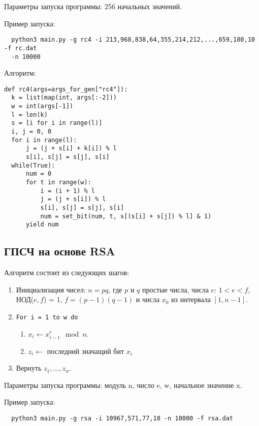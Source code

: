 \documentclass[spec, och, labwork]{shiza}
\begin{document}
Параметры запуска программы: 256 начальных значений.

Пример запуска:
\begin{small}
\begin{verbatim}
  python3 main.py -g rc4 -i 213,968,838,64,355,214,212,...,659,180,10 -f rc.dat 
  -n 10000
 \end{verbatim}
\end{small}

Алгоритм:
\begin{small}
\begin{verbatim}
def rc4(args=args_for_gen["rc4"]):
  k = list(map(int, args[:-2]))
  w = int(args[-1])
  l = len(k)
  s = [i for i in range(l)]
  i, j = 0, 0
  for i in range(l):
      j = (j + s[i] + k[i]) % l
      s[i], s[j] = s[j], s[i]
  while(True):
      num = 0
      for t in range(w):
          i = (i + 1) % l
          j = (j + s[i]) % l
          s[i], s[j] = s[j], s[i]
          num = set_bit(num, t, s[(s[i] + s[j]) % l] & 1)
      yield num
\end{verbatim}
\end{small}


\subsection{ГПСЧ на основе RSA}

Алгоритм состоит из следующих шагов:
\begin{enumerate}
  \item Инициализация чисел: $n = pq$, где $p$ и $q$ простые числа, числа $e$: $1 < e < f$, НОД($e, f$) = 1, $f = (p - 1)(q - 1)$ и числа $x_0$ из интервала $[1, n - 1]$.
  \item \texttt{For i = 1 to w do}
        \begin{enumerate}
          \item $x_i \leftarrow x_{i-1}^e \mod n$.
          \item $z_i \leftarrow $ последний значащий бит $x_i$
        \end{enumerate}
  \item Вернуть $z_1, \dots, z_w$.
\end{enumerate}

Параметры запуска программы: модуль n, число e, w, начальное значение x.

Пример запуска:
\begin{small}
\begin{verbatim}
  python3 main.py -g rsa -i 10967,571,77,10 -n 10000 -f rsa.dat
 \end{verbatim}
\end{small}
\end{document}
